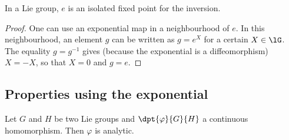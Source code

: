 \begin{lemma}
In a Lie group, $e$ is an isolated fixed point for the inversion.
\end{lemma}

\begin{proof}
One can use an exponential map in a neighbourhood of $e$. In this neighbourhood, an element $g$ can be written as $g=e^X$ for a certain $X\in\lG$. The equality $g=g^{-1}$ gives (because the exponential is a diffeomorphism) $X=-X$, so that $X=0$ and $g=e$.
\end{proof}

\subsection{Properties using the exponential}

\begin{theorem}
Let $G$ and $H$ be two Lie groups and $\dpt{\varphi}{G}{H}$ a continuous homomorphism. Then $\varphi$ is analytic.
\end{theorem}

